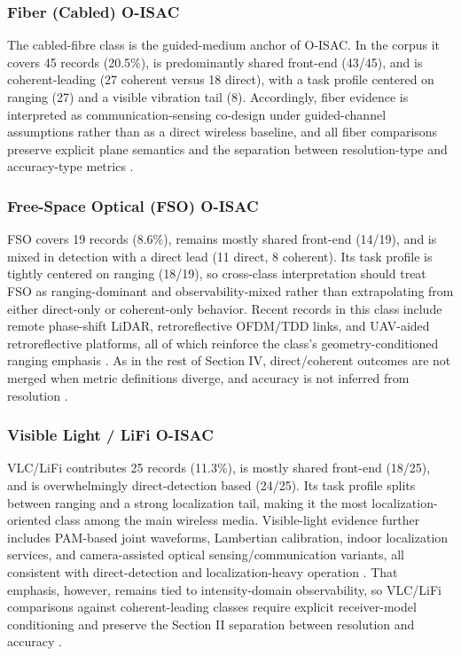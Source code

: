\documentclass[letterpaper,journal]{IEEEtran}
\begin{document}
\subsubsection{Fiber (Cabled) O-ISAC}
The cabled-fibre class is the guided-medium anchor of O-ISAC. In the corpus it covers 45 records (20.5\%), is predominantly shared front-end (43/45), and is coherent-leading (27 coherent versus 18 direct), with a task profile centered on ranging (27) and a visible vibration tail (8). Accordingly, fiber evidence is interpreted as communication-sensing co-design under guided-channel assumptions rather than as a direct wireless baseline, and all fiber comparisons preserve explicit plane semantics and the separation between resolution-type and accuracy-type metrics \cite{O_ISAC_006,O_ISAC_033,O_ISAC_046,O_ISAC_041,O_ISAC_090}.

\subsubsection{Free-Space Optical (FSO) O-ISAC}
FSO covers 19 records (8.6\%), remains mostly shared front-end (14/19), and is mixed in detection with a direct lead (11 direct, 8 coherent). Its task profile is tightly centered on ranging (18/19), so cross-class interpretation should treat FSO as ranging-dominant and observability-mixed rather than extrapolating from either direct-only or coherent-only behavior. Recent records in this class include remote phase-shift LiDAR, retroreflective OFDM/TDD links, and UAV-aided retroreflective platforms, all of which reinforce the class's geometry-conditioned ranging emphasis \cite{O_ISAC_040,O_ISAC_051,O_ISAC_099,O_ISAC_106}. As in the rest of Section IV, direct/coherent outcomes are not merged when metric definitions diverge, and accuracy is not inferred from resolution \cite{O_ISAC_021,O_ISAC_035,O_ISAC_005,O_ISAC_023,O_ISAC_199}.

\subsubsection{Visible Light / LiFi O-ISAC}
VLC/LiFi contributes 25 records (11.3\%), is mostly shared front-end (18/25), and is overwhelmingly direct-detection based (24/25). Its task profile splits between ranging and a strong localization tail, making it the most localization-oriented class among the main wireless media. Visible-light evidence further includes PAM-based joint waveforms, Lambertian calibration, indoor localization services, and camera-assisted optical sensing/communication variants, all consistent with direct-detection and localization-heavy operation \cite{O_ISAC_092,O_ISAC_110,O_ISAC_131,O_ISAC_139}. That emphasis, however, remains tied to intensity-domain observability, so VLC/LiFi comparisons against coherent-leading classes require explicit receiver-model conditioning and preserve the Section II separation between resolution and accuracy \cite{O_ISAC_068,O_ISAC_303,O_ISAC_039,O_ISAC_327,O_ISAC_062,O_ISAC_009}.
\end{document}
